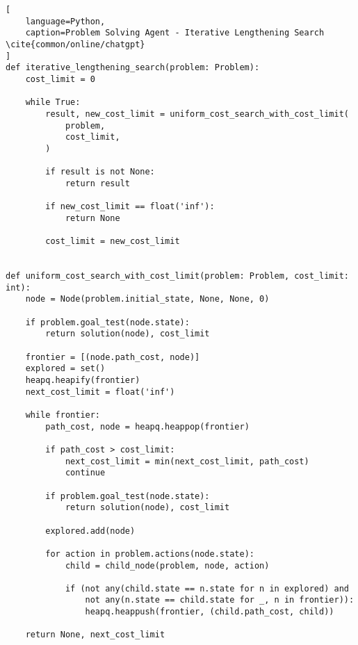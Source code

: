 \begin{lstlisting}[
    language=Python,
    caption=Problem Solving Agent - Iterative Lengthening Search \cite{common/online/chatgpt}
]
def iterative_lengthening_search(problem: Problem):
    cost_limit = 0

    while True:
        result, new_cost_limit = uniform_cost_search_with_cost_limit(
            problem, 
            cost_limit,
        )

        if result is not None:
            return result

        if new_cost_limit == float('inf'):
            return None

        cost_limit = new_cost_limit


def uniform_cost_search_with_cost_limit(problem: Problem, cost_limit: int):
    node = Node(problem.initial_state, None, None, 0)

    if problem.goal_test(node.state):
        return solution(node), cost_limit
    
    frontier = [(node.path_cost, node)]
    explored = set()
    heapq.heapify(frontier)
    next_cost_limit = float('inf')

    while frontier:
        path_cost, node = heapq.heappop(frontier)

        if path_cost > cost_limit:
            next_cost_limit = min(next_cost_limit, path_cost)
            continue

        if problem.goal_test(node.state):
            return solution(node), cost_limit

        explored.add(node)

        for action in problem.actions(node.state):
            child = child_node(problem, node, action)

            if (not any(child.state == n.state for n in explored) and 
                not any(n.state == child.state for _, n in frontier)):
                heapq.heappush(frontier, (child.path_cost, child))

    return None, next_cost_limit
\end{lstlisting}






